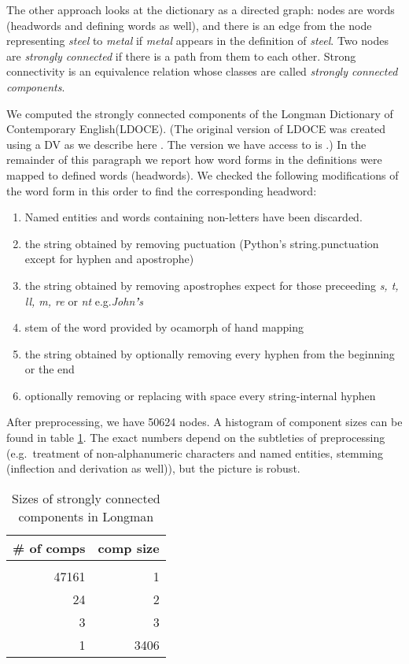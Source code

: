 \documentclass[a4paper,10pt]{article}
\begin{document}
The other approach looks at the dictionary as a directed graph: nodes are
words (headwords and defining words as well), and there is an edge from the
node representing \emph{steel} to \emph{metal} if \emph{metal} appears in the
definition of \emph{steel}. Two nodes are \emph{strongly connected} if there
is a path from them to each other. Strong connectivity is an equivalence
relation whose classes are called \emph{strongly connected components}. 

We computed the strongly connected components of the Longman Dictionary of
Contemporary English(LDOCE). (The original version of LDOCE was created using
a DV as we describe here \cite{Boguraev:1989}. The version we have access to
is \cite{Bullon:2003}.) In the remainder of this paragraph we report how word
forms in the definitions were mapped to defined words (headwords). We checked
the following modifications of the word form in this order to find the
corresponding headword:
\begin{enumerate}
 \item Named entities and words containing non-letters have been discarded.
 \item the string obtained by removing puctuation (Python's string.punctuation except for hyphen and apostrophe)
 \item the string obtained by removing apostrophes expect for those preceeding \emph{s, t, ll, m, re} or \emph{nt} e.g.\emph{John\textbf{'}s}
 \item stem of the word provided by ocamorph \cite{ocamorph} of hand mapping
 \item the string obtained by optionally removing every hyphen from the beginning or the end
 \item optionally removing or replacing with space every string-internal hyphen
\end{enumerate}

After preprocessing, we have 50624
nodes. A histogram of component sizes can be found in table
\ref{table_compon}. The exact numbers depend on the subtleties of
preprocessing (e.g.\ treatment of non-alphanumeric characters and named
entities, stemming (inflection and derivation as well)), but the picture is
robust.


\begin{table}
 \begin{center}
  \begin{tabular}{rr}
   \toprule
   \# of comps & comp size
   \\\midrule
   \\  47161	& 1
   \\  24	& 2
   \\  3	& 3
   \\  1        & 3406
   \\ \bottomrule
  \end{tabular}
  \caption{Sizes of strongly connected components in Longman}
  \label{table_compon}
 \end{center}
\end{table}
\end{document}
